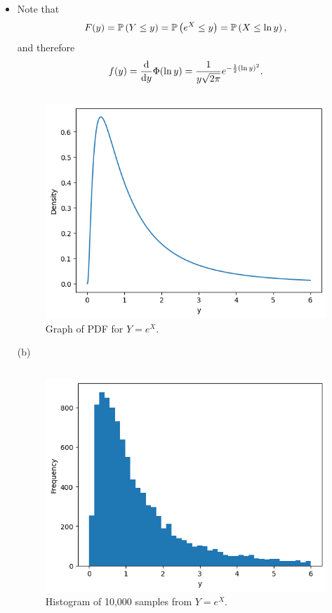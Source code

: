 \begin{ex}
  \begin{itemize}[(a)]
    \item
          Note that
          \[
            F(y)
            =\P{Y\leq y}
            =\P{e^X \leq y}
            =\P{X \leq \ln {y}},
          \]
          and therefore
          \[
            f(y)
            =\frac{\d}{\d{y}}\Phi(\ln {y})
            =\frac{1}{y\sqrt{2\pi}}e^{-\frac{1}{2}(\ln{y})^2}.
          \]

          \inputminted{python}{../code/02-13a.py}
          \begin{figure}[H]
            \centering
            \includegraphics[scale=0.98]{../images/02-13a}
            \caption{Graph of PDF for $Y=e^X$.}
          \end{figure}

    \item[(b)]
          \inputminted{python}{../code/02-13b.py}

          \begin{figure}[H]
            \centering
            \includegraphics[scale=0.98]{../images/02-13b}
            \caption{Histogram of 10,000 samples from $Y=e^X$.}
          \end{figure}
  \end{itemize}
\end{ex}

